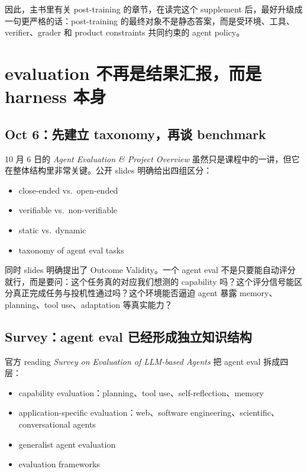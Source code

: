 \documentclass[11pt]{ctexbook}
\begin{document}
因此，主书里有关 post-training 的章节，在读完这个 supplement 后，最好升级成一句更严格的话：post-training 的最终对象不是静态答案，而是受环境、工具、verifier、grader 和 product constraints 共同约束的 agent policy。

\section{evaluation 不再是结果汇报，而是 harness 本身}

\subsection{Oct 6：先建立 taxonomy，再谈 benchmark}

10 月 6 日的 \emph{Agent Evaluation \& Project Overview} 虽然只是课程中的一讲，但它在整体结构里非常关键。公开 slides 明确给出四组区分：

\begin{itemize}
\item close-ended vs.\ open-ended
\item verifiable vs.\ non-verifiable
\item static vs.\ dynamic
\item taxonomy of agent eval tasks
\end{itemize}

同时 slides 明确提出了 Outcome Validity。一个 agent eval 不是只要能自动评分就行，而是要问：这个任务真的对应我们想测的 capability 吗？这个评分信号能区分真正完成任务与投机性通过吗？这个环境能否逼迫 agent 暴露 memory、planning、tool use、adaptation 等真实能力？

\subsection{Survey：agent eval 已经形成独立知识结构}

官方 reading \emph{Survey on Evaluation of LLM-based Agents} 把 agent eval 拆成四层：

\begin{itemize}
\item capability evaluation：planning、tool use、self-reflection、memory
\item application-specific evaluation：web、software engineering、scientific、conversational agents
\item generalist agent evaluation
\item evaluation frameworks
\end{itemize}
\end{document}
